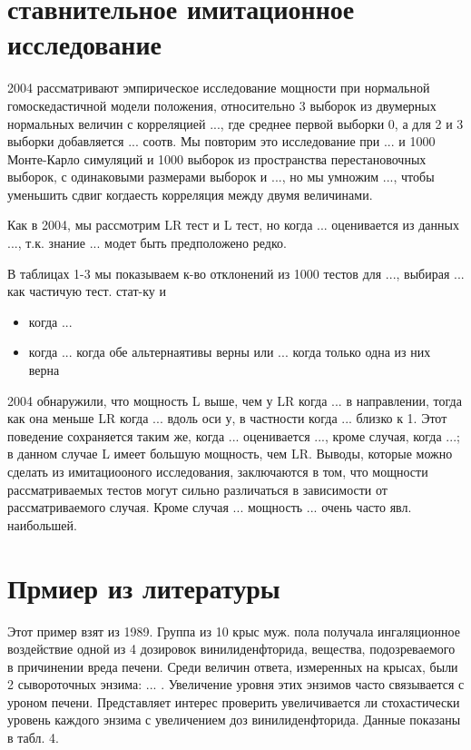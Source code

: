 \documentclass{article}
\begin{document}
\section{ставнительное имитационное исследование}
2004 рассматривают эмпирическое исследование мощности при нормальной гомоскедастичной модели положения, относительно 3 выборок из двумерных нормальных величин с корреляцией ..., где среднее первой выборки 0, а для 2 и 3 выборки добавляется ... соотв. Мы повторим это исследование при ... и 1000 Монте-Карло симуляций и 1000 выборок из пространства перестановочных выборок, с одинаковыми размерами выборок и ..., но мы умножим ..., чтобы уменьшить сдвиг когдаесть корреляция между двумя величинами.

Как в 2004, мы рассмотрим LR тест и L тест, но когда ... оценивается из данных ..., т.к. знание ... модет быть предположено редко.

В таблицах 1-3 мы показываем к-во отклонений из 1000 тестов для ..., выбирая ... как частичую тест. стат-ку и
\begin{itemize}
  \item когда ...

  \item когда ... когда обе альтернаятивы верны или ... когда только одна из них верна
\end{itemize}

2004 обнаружили, что мощность L выше, чем у LR когда ... в направлении, тогда как она меньше LR когда ... вдоль оси у, в частности когда ... близко к 1. Этот поведение сохраняется таким же, когда ... оценивается ..., кроме случая, когда ...; в данном случае L имеет большую мощность, чем LR. Выводы, которые можно сделать из имитациооного исследования, заключаются в том, что мощности рассматриваемых тестов могут сильно различаться в зависимости от рассматриваемого случая. Кроме случая ... мощность ... очень часто явл. наибольшей.

\section{Прмиер из литературы}
Этот пример взят из 1989. Группа из 10 крыс муж. пола получала ингаляционное воздействие одной из 4 дозировок винилиденфторида, вещества, подозреваемого в причинении вреда печени. Среди величин ответа, измеренных на крысах, были 2 сывороточных энзима: ... . Увеличение уровня этих энзимов часто связывается с уроном печени. Представляет интерес проверить увеличивается ли стохастически уровень каждого энзима с увеличением доз винилиденфторида. Данные показаны в табл. 4.
\end{document}
